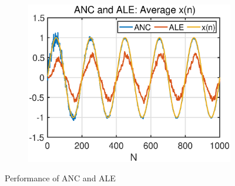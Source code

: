 \begin{figure}[htb]
    \hspace{-0.1cm}
    \begin{subfigure}[b]{0.33\textwidth}
     \centering
     \includegraphics[width=1.1\textwidth]{fig/23/23c3.eps}
    \end{subfigure} 
    \caption{Performance of ANC and ALE}
    \label{fig:2_3_c}
\end{figure}
